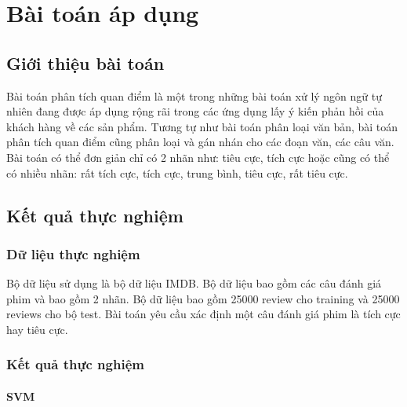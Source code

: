 \documentclass[a4paper,12pt]{report}
\begin{document}
\chapter{Bài toán áp dụng}
\section{Giới thiệu bài toán}
Bài toán phân tích quan điểm là một trong những bài toán xử lý ngôn ngữ tự nhiên đang được áp dụng rộng rãi trong các ứng dụng lấy ý kiến phản hồi của khách hàng về các sản phẩm. Tương tự như bài toán phân loại văn bản, bài toán phân tích quan điểm cũng phân loại và gán nhán cho các đoạn văn, các câu văn. Bài toán có thể đơn giản chỉ có 2 nhãn như: tiêu cực, tích cực hoặc cũng có thể có nhiều nhãn: rất tích cực, tích cực, trung bình, tiêu cực, rất tiêu cực. 


\section{Kết quả thực nghiệm}
\subsection{Dữ liệu thực nghiệm}
Bộ dữ liệu sử dụng là bộ dữ liệu IMDB. Bộ dữ liệu bao gồm các câu đánh giá phim và bao gồm 2 nhãn. Bộ dữ liệu bao gồm 25000 review cho training và 25000 reviews cho bộ test. Bài toán yêu cầu xác định một câu đánh giá phim là tích cực hay tiêu cực.

\subsection{Kết quả thực nghiệm}
\subsubsection{SVM}
\end{document}
